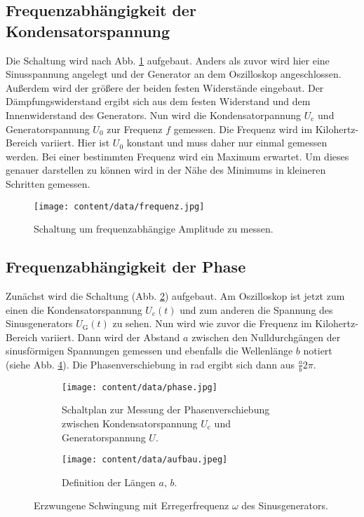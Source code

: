 \subsection{Frequenzabhängigkeit der Kondensatorspannung}
Die Schaltung wird nach Abb. \ref{fig:spannungc} aufgebaut.
Anders als zuvor wird hier eine Sinusspannung angelegt und der Generator an dem Oszilloskop angeschlossen.
Außerdem wird der größere der beiden festen Widerstände eingebaut.
Der Dämpfungswiderstand ergibt sich aus dem festen Widerstand und dem Innenwiderstand des Generators.
Nun wird die Kondensatorpannung $U_\text{c}$ und Generatorspannung $U_0$ zur Frequenz $f$ gemessen.
Die Frequenz wird im Kilohertz-Bereich variiert.
Hier ist $U_0$ konstant und muss daher nur einmal gemessen werden.
Bei einer bestimmten Frequenz wird ein Maximum erwartet.
Um dieses genauer darstellen zu können wird in der Nähe des Minimums in kleineren Schritten gemessen.
\begin{figure}
    \centering
    \texttt{[image: content/data/frequenz.jpg]}
    \caption{Schaltung um frequenzabhängige Amplitude zu messen. \cite[S.295]{anleitung}}
    \label{fig:spannungc}
\end{figure}

\subsection{Frequenzabhängigkeit der Phase}
Zunächst wird die Schaltung (Abb. \ref{fig:phase}) aufgebaut.
Am Oszilloskop ist jetzt zum einen die Kondensatorspannung $U_\text{c}(t)$ und zum anderen die Spannung des Sinusgenerators $U_\text{G}(t)$ zu sehen.
Nun wird wie zuvor die Frequenz im Kilohertz-Bereich variiert.
Dann wird der Abstand $a$ zwischen den Nulldurchgängen der sinusförmigen Spannungen gemessen und ebenfalls die Wellenlänge $b$ notiert (siehe Abb. \ref{fig:phase_ab}).
Die Phasenverschiebung in rad ergibt sich dann aus $\frac{a}{b}2\pi$.
\begin{figure}
    \centering
    \begin{subfigure}{0.48\textwidth}
        \centering
        \texttt{[image: content/data/phase.jpg]}
        \caption{Schaltplan zur Messung der Phasenverschiebung zwischen Kondensatorspannung $U_\text{c}$ und Generatorspannung $U$. \cite[S.296]{anleitung}}
        \label{fig:phase}
    \end{subfigure}
    \begin{subfigure}{0.48\textwidth}
        \centering
        \texttt{[image: content/data/aufbau.jpeg]}
        \caption{Definition der Längen $a$, $b$. \cite[S.282]{anleitung_rc}} 
        \label{fig:phase_ab}
    \end{subfigure}
    \caption{Erzwungene Schwingung mit Erregerfrequenz $\omega$ des Sinusgenerators.}
\end{figure}